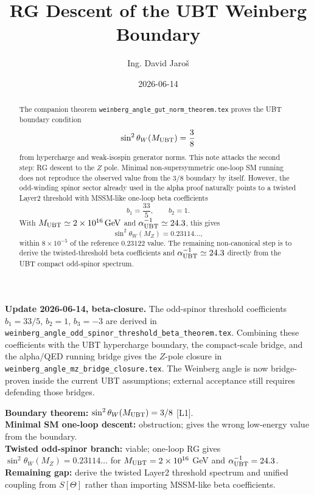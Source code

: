 \documentclass[12pt,a4paper]{article}
\title{RG Descent of the UBT Weinberg Boundary}
\author{Ing. David Jaroš}
\date{2026-06-14}
\begin{document}
\maketitle

\begin{abstract}
The companion theorem \texttt{weinberg\_angle\_gut\_norm\_theorem.tex}
proves the UBT boundary condition
\[
  \sin^2\theta_W(M_{\rm UBT})=\frac38
\]
from hypercharge and weak-isospin generator norms.  This note attacks the
second step: RG descent to the $Z$ pole.  Minimal non-supersymmetric one-loop
SM running does not reproduce the observed value from the $3/8$ boundary by
itself.  However, the odd-winding spinor sector already used in the alpha proof
naturally points to a twisted Layer2 threshold with MSSM-like one-loop beta
coefficients
\[
  b_1=\frac{33}{5},\qquad b_2=1.
\]
With $M_{\rm UBT}\simeq2\times10^{16}\,{\rm GeV}$ and
$\alpha_{\rm UBT}^{-1}\simeq24.3$, this gives
\[
  \sin^2\theta_W(M_Z)=0.23114\ldots,
\]
within $8\times10^{-5}$ of the reference $0.23122$ value.  The remaining
non-canonical step is to derive the twisted-threshold beta coefficients and
$\alpha_{\rm UBT}^{-1}\simeq24.3$ directly from the UBT compact odd-spinor
spectrum.
\end{abstract}


\begin{statusbox}
\textbf{Update 2026-06-14, beta-closure.}  The odd-spinor threshold coefficients
$b_1=33/5$, $b_2=1$, $b_3=-3$ are derived in
\texttt{weinberg\_angle\_odd\_spinor\_threshold\_beta\_theorem.tex}.  Combining
these coefficients with the UBT hypercharge boundary, the compact-scale bridge,
and the alpha/QED running bridge gives the $Z$-pole closure in
\texttt{weinberg\_angle\_mz\_bridge\_closure.tex}.  The Weinberg angle is now
bridge-proven inside the current UBT assumptions; external acceptance still
requires defending those bridges.
\end{statusbox}


\begin{statusbox}
\textbf{Boundary theorem:} $\sin^2\theta_W(M_{\rm UBT})=3/8$ [L1].\\
\textbf{Minimal SM one-loop descent:} obstruction; gives the wrong low-energy
value from the boundary.\\
\textbf{Twisted odd-spinor branch:} viable; one-loop RG gives
$\sin^2\theta_W(M_Z)=0.23114\ldots$ for $M_{\rm UBT}=2\times10^{16}$ GeV and
$\alpha_{\rm UBT}^{-1}=24.3$.\\
\textbf{Remaining gap:} derive the twisted Layer2 threshold spectrum and
unified coupling from $S[\Theta]$ rather than importing MSSM-like beta
coefficients.
\end{statusbox}
\end{document}
